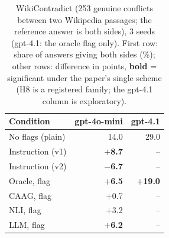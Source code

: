 \begin{table}[t]
\centering\small
\begin{tabular}{lrr}
\toprule
Condition & gpt-4o-mini & gpt-4.1 \\
\midrule
No flags (plain) & 14.0 & 29.0 \\
\midrule
Instruction (v1) & \textbf{$+$8.7} & -- \\
Instruction (v2) & \textbf{$-$6.7} & -- \\
Oracle, flag & \textbf{$+$6.5} & \textbf{$+$19.0} \\
CAAG, flag & $+$0.7 & -- \\
NLI, flag & $+$3.2 & -- \\
LLM, flag & \textbf{$+$6.2} & -- \\
\bottomrule
\end{tabular}
\caption{WikiContradict (253 genuine conflicts between two Wikipedia passages; the reference answer is both sides),
3 seeds (gpt-4.1: the oracle flag only). First row: share of answers giving both sides (\%); other rows: difference in points,
\textbf{bold} = significant under the paper's single scheme (H8 is a registered family; the gpt-4.1
column is exploratory).}
\label{tab:wiki}
\end{table}
